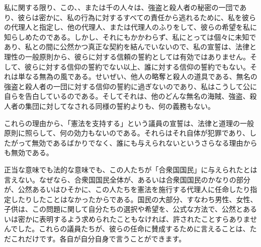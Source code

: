 \documentclass[dvipdfmx, uplatex, tate, landscape]{utbook}
\begin{document}
私に関する限り、この、、または千の人々は、強盗と殺人者の秘密の一団であり、彼らは密かに、私の行為に対するすべての責任から逃れるために、私を彼らの代理人と指定し、他の代理人、または代理人のふりをして、彼らの希望を私に知らしめたのである。しかし、それにもかかわらず、私にとっては個々に未知であり、私との間に公然かつ真正な契約を結んでいないので、私の宣誓は、法律と理性の一般原則から、彼らに対する信頼の誓約としては有効ではありません。そして、彼らに対する信仰の誓約でない以上、誰に対する信仰の誓約でもない。それは単なる無為の風である。せいぜい、他人の略奪と殺人の道具である、無名の強盗と殺人者の一団に対する信仰の誓約に過ぎないのであり、私はこうして公に自らを告白しているのである。そしてそれは、他のどんな無名の海賊、強盗、殺人者の集団に対してなされる同様の誓約よりも、何の義務もない。

これらの理由から、「憲法を支持する」という議員の宣誓は、法律と道理の一般原則に照らして、何の効力もないのである。それらはそれ自体が犯罪であり、したがって無効であるばかりでなく、誰にも与えられないというさらなる理由からも無効である。

正当な意味でも法的な意味でも、この人たちが「合衆国国民」に与えられたとは言えない。なぜなら、合衆国国民全体が、あるいは合衆国国民のかなりの部分が、公然あるいはひそかに、この人たちを憲法を施行する代理人に任命したり指定したりしたことはなかったからである。国民の大部分、すなわち男性、女性、子供は、この問題に関して自分たちの選択や希望を、公式な方法で、公然とあるいは密かに表明するよう求められたこともなければ、許されたことすらありませんでした。これらの議員たちが、彼らの任命に賛成するために言えることは、ただこれだけです。各自が自分自身で言うことができます。
\end{document}
